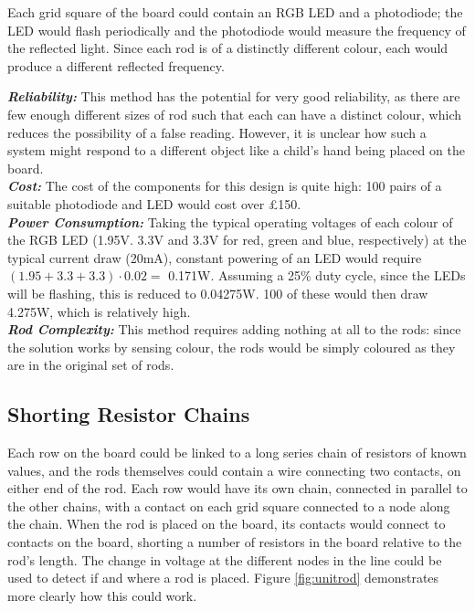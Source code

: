 Each grid square of the board could contain an RGB LED and a photodiode; the LED would flash periodically and the photodiode would measure the frequency of the reflected light. Since each rod is of a distinctly different colour, each would produce a different reflected frequency.\\

{
\setlength{\parindent}{0pt} 

\textbf{\textit{Reliability:}} This method has the potential for very good reliability, as there are few enough different sizes of rod such that each can have a distinct colour, which reduces the possibility of a false reading. However, it is unclear how such a system might respond to a different object like a child's hand being placed on the board. \\

\textbf{\textit{Cost:}} The cost of the components for this design is quite high: 100 pairs of a suitable photodiode \cite{KPS5130P52:online} and LED \cite{L154A4SU86:online} would cost over £150.  \\

\textbf{\textit{Power Consumption:}} Taking the typical operating voltages of each colour of the RGB LED (1.95V. 3.3V and 3.3V for red, green and blue, respectively) at the typical current draw (20mA), constant powering of an LED would require $(1.95 + 3.3 + 3.3) \cdot 0.02 =$ 0.171W. Assuming a 25\% duty cycle, since the LEDs will be flashing, this is reduced to 0.04275W. 100 of these would then draw 4.275W, which is relatively high.\\

\textbf{\textit{Rod Complexity:}} This method requires adding nothing at all to the rods: since the solution works by sensing colour, the rods would be simply coloured as they are in the original set of rods.\\
}


\subsection{Shorting Resistor Chains}
\label{resistors}

Each row on the board could be linked to a long series chain of resistors of known values, and the rods themselves could contain a wire connecting two contacts, on either end of the rod. Each row would have its own chain, connected in parallel to the other chains, with a contact on each grid square connected to a node along the chain. When the rod is placed on the board, its contacts would connect to contacts on the board, shorting a number of resistors in the board relative to the rod's length. The change in voltage at the different nodes in the line could be used to detect if and where a rod is placed. Figure \ref{fig:unitrod} demonstrates more clearly how this could work.\\

